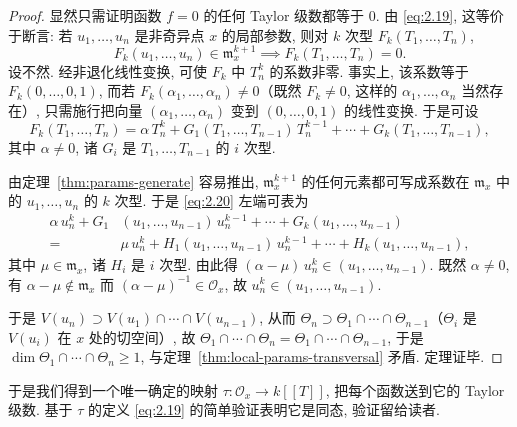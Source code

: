 \begin{proof}
	显然只需证明函数 $f = 0$ 的任何 Taylor 级数都等于 $0$. 由 \eqref{eq:2.19}, 这等价于断言: 若 $u_1, \ldots, u_n$ 是非奇异点 $x$ 的局部参数, 则对 $k$ 次型 $F_k(T_1, \ldots, T_n)$,
	\begin{equation}
		\label{eq:2.20}
		F_k(u_1, \ldots, u_n) \in \mathfrak m_x^{k+1} \implies F_k(T_1, \ldots, T_n) = 0.
	\end{equation}
	设不然. 经非退化线性变换, 可使 $F_k$ 中 $T_n^k$ 的系数非零. 事实上, 该系数等于 $F_k(0, \ldots, 0, 1)$, 而若 $F_k(\alpha_1, \ldots, \alpha_n) \ne 0$（既然 $F_k \ne 0$, 这样的 $\alpha_1, \ldots, \alpha_n$ 当然存在）, 只需施行把向量 $(\alpha_1, \ldots, \alpha_n)$ 变到 $(0, \ldots, 0, 1)$ 的线性变换. 于是可设
	\[
		F_k(T_1, \ldots, T_n) = \alpha\, T_n^k + G_1(T_1, \ldots, T_{n-1})\, T_n^{k-1} + \cdots + G_k(T_1, \ldots, T_{n-1}),
	\]
	其中 $\alpha \ne 0$, 诸 $G_i$ 是 $T_1, \ldots, T_{n-1}$ 的 $i$ 次型.

	由定理~\ref{thm:params-generate} 容易推出, $\mathfrak m_x^{k+1}$ 的任何元素都可写成系数在 $\mathfrak m_x$ 中的 $u_1, \ldots, u_n$ 的 $k$ 次型. 于是 \eqref{eq:2.20} 左端可表为
	\begin{equation}
		\label{eq:2.21}
		\begin{split}
			\alpha\, u_n^k + G_1&(u_1, \ldots, u_{n-1})\, u_n^{k-1} + \cdots + G_k(u_1, \ldots, u_{n-1}) \\
			={}& \mu\, u_n^k + H_1(u_1, \ldots, u_{n-1})\, u_n^{k-1} + \cdots + H_k(u_1, \ldots, u_{n-1}),
		\end{split}
	\end{equation}
	其中 $\mu \in \mathfrak m_x$, 诸 $H_i$ 是 $i$ 次型. 由此得 $(\alpha - \mu)\, u_n^k \in (u_1, \ldots, u_{n-1})$. 既然 $\alpha \ne 0$, 有 $\alpha - \mu \notin \mathfrak m_x$ 而 $(\alpha - \mu)^{-1} \in \mathcal O_x$, 故 $u_n^k \in (u_1, \ldots, u_{n-1})$.

	于是 $V(u_n) \supset V(u_1) \cap \cdots \cap V(u_{n-1})$, 从而 $\Theta_n \supset \Theta_1 \cap \cdots \cap \Theta_{n-1}$（$\Theta_i$ 是 $V(u_i)$ 在 $x$ 处的切空间）, 故 $\Theta_1 \cap \cdots \cap \Theta_n = \Theta_1 \cap \cdots \cap \Theta_{n-1}$, 于是 $\dim \Theta_1 \cap \cdots \cap \Theta_n \ge 1$, 与定理~\ref{thm:local-params-transversal} 矛盾. 定理证毕.
\end{proof}

于是我们得到一个唯一确定的映射 $\tau: \mathcal O_x \to k[[T]]$, 把每个函数送到它的 Taylor 级数. 基于 $\tau$ 的定义 \eqref{eq:2.19} 的简单验证表明它是同态, 验证留给读者.

